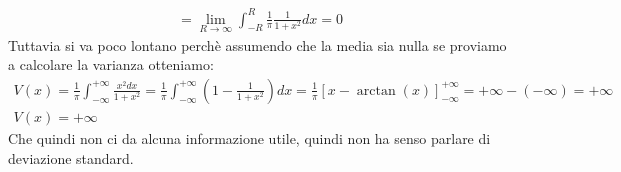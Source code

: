\documentclass[a4paper, oneside]{article}
\begin{document}
\begin{gather*}
    = \lim_{R \to \infty} \int_{-R}^{R} \frac{1}{\pi} \frac{1}{1 + x^2} dx = 0
\end{gather*}
Tuttavia si va poco lontano perchè assumendo che la media sia nulla se proviamo a calcolare la varianza otteniamo:
\begin{gather*}
    V(x) = \frac{1}{\pi} \int_{-\infty}^{+\infty} \frac{x^2 dx}{1 + x^2} = \frac{1}{\pi} \int_{-\infty}^{+\infty} \left( 1 - \frac{1}{1 + x^2} \right) dx = \frac{1}{\pi} \left[ x - \arctan(x) \right]_{-\infty}^{+\infty} = +\infty - (-\infty) = +\infty\\
    V(x) = +\infty
\end{gather*}
Che quindi non ci da alcuna informazione utile, quindi non ha senso parlare di deviazione standard.\\
\end{document}
